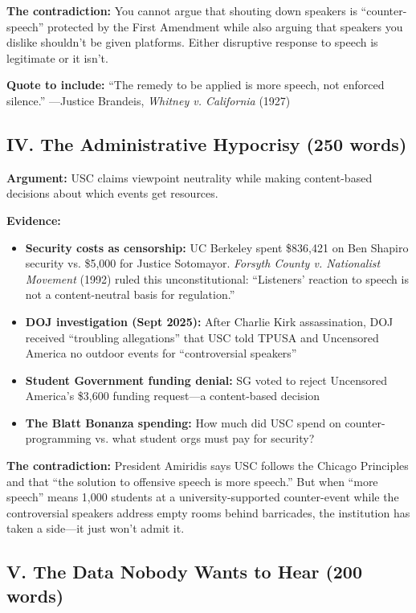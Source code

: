 \documentclass[11pt,letterpaper]{article}
\begin{document}
\textbf{The contradiction:} You cannot argue that shouting down speakers is ``counter-speech'' protected by the First Amendment while also arguing that speakers you dislike shouldn't be given platforms. Either disruptive response to speech is legitimate or it isn't.

\textbf{Quote to include:} ``The remedy to be applied is more speech, not enforced silence.'' ---Justice Brandeis, \textit{Whitney v. California} (1927)

\subsection{IV. The Administrative Hypocrisy (250 words)}

\textbf{Argument:} USC claims viewpoint neutrality while making content-based decisions about which events get resources.

\textbf{Evidence:}
\begin{itemize}[noitemsep]
    \item \textbf{Security costs as censorship:} UC Berkeley spent \$836,421 on Ben Shapiro security vs. \$5,000 for Justice Sotomayor. \textit{Forsyth County v. Nationalist Movement} (1992) ruled this unconstitutional: ``Listeners' reaction to speech is not a content-neutral basis for regulation.''
    \item \textbf{DOJ investigation (Sept 2025):} After Charlie Kirk assassination, DOJ received ``troubling allegations'' that USC told TPUSA and Uncensored America no outdoor events for ``controversial speakers''
    \item \textbf{Student Government funding denial:} SG voted to reject Uncensored America's \$3,600 funding request---a content-based decision
    \item \textbf{The Blatt Bonanza spending:} How much did USC spend on counter-programming vs. what student orgs must pay for security?
\end{itemize}

\textbf{The contradiction:} President Amiridis says USC follows the Chicago Principles and that ``the solution to offensive speech is more speech.'' But when ``more speech'' means 1,000 students at a university-supported counter-event while the controversial speakers address empty rooms behind barricades, the institution has taken a side---it just won't admit it.

\subsection{V. The Data Nobody Wants to Hear (200 words)}
\end{document}

